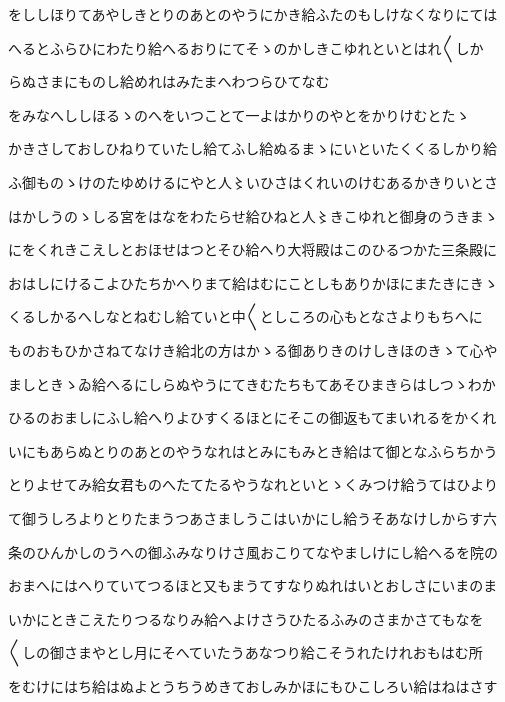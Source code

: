 \documentclass[a4paper,11pt,landscape]{ltjtarticle}
\begin{document}
\par\medskip
をししほりてあやしきとりのあとのやうにかき給ふたのもしけなくなりにては
\par\medskip
へるとふらひにわたり給へるおりにてそゝのかしきこゆれといとはれ〱しか
\par\medskip
らぬさまにものし給めれはみたまへわつらひてなむ
\par\medskip
をみなへししほるゝのへをいつことて一よはかりのやとをかりけむとたゝ
\par\medskip
かきさしておしひねりていたし給てふし給ぬるまゝにいといたくくるしかり給
\par\medskip
ふ御ものゝけのたゆめけるにやと人〻いひさはくれいのけむあるかきりいとさ
\par\medskip
はかしうのゝしる宮をはなをわたらせ給ひねと人〻きこゆれと御身のうきまゝ
\par\medskip
にをくれきこえしとおほせはつとそひ給へり大将殿はこのひるつかた三条殿に
\par\medskip
おはしにけるこよひたちかへりまて給はむにことしもありかほにまたきにきゝ
\par\medskip
くるしかるへしなとねむし給ていと中〱としころの心もとなさよりもちへに
\par\medskip
ものおもひかさねてなけき給北の方はかゝる御ありきのけしきほのきゝて心や
\par\medskip
ましときゝゐ給へるにしらぬやうにてきむたちもてあそひまきらはしつゝわか
\par\medskip
ひるのおましにふし給へりよひすくるほとにそこの御返もてまいれるをかくれ
\par\medskip
いにもあらぬとりのあとのやうなれはとみにもみとき給はて御となふらちかう
\par\medskip
とりよせてみ給女君ものへたてたるやうなれといとゝくみつけ給うてはひより
\par\medskip
て御うしろよりとりたまうつあさましうこはいかにし給うそあなけしからす六
\par\medskip
条のひんかしのうへの御ふみなりけさ風おこりてなやましけにし給へるを院の
\par\medskip
おまへにはへりていてつるほと又もまうてすなりぬれはいとおしさにいまのま
\par\medskip
いかにときこえたりつるなりみ給へよけさうひたるふみのさまかさてもなを
\par\medskip
〱しの御さまやとし月にそへていたうあなつり給こそうれたけれおもはむ所
\par\medskip
をむけにはち給はぬよとうちうめきておしみかほにもひこしろい給はねはさす
\par\medskip
\end{document}
